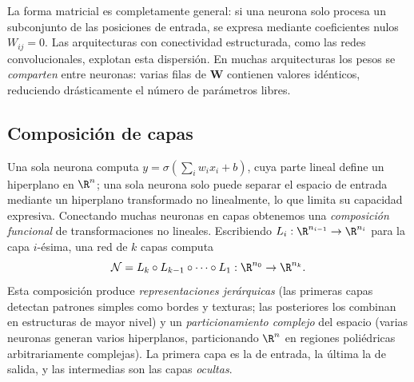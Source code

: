La forma matricial es completamente general: si una neurona solo procesa un
subconjunto de las posiciones de entrada, se expresa mediante coeficientes nulos
$W_{ij} = 0$. Las arquitecturas con conectividad estructurada, como las redes
convolucionales, explotan esta dispersi\'on. En muchas arquitecturas los pesos se
\emph{comparten} entre neuronas: varias filas de $\mathbf{W}$ contienen valores
id\'enticos, reduciendo dr\'asticamente el n\'umero de par\'ametros libres.

\subsection{Composici\'on de capas}
\label{sec:found:composition}

Una sola neurona computa $y = \sigma(\sum_i w_i x_i + b)$, cuya parte lineal define
un hiperplano en $\R^n$; una sola neurona solo puede separar el espacio de entrada
mediante un hiperplano transformado no linealmente, lo que limita su capacidad
expresiva. Conectando muchas neuronas en capas obtenemos una \emph{composici\'on
funcional} de transformaciones no lineales. Escribiendo $L_i : \R^{n_{i-1}} \to
\R^{n_i}$ para la capa $i$-\'esima, una red de $k$ capas computa
\[
  \mathcal{N} = L_k \circ L_{k-1} \circ \cdots \circ L_1 :
  \R^{n_0} \to \R^{n_k}.
\]
Esta composici\'on produce \emph{representaciones jer\'arquicas} (las primeras
capas detectan patrones simples como bordes y texturas; las posteriores los
combinan en estructuras de mayor nivel) y un \emph{particionamiento complejo} del
espacio (varias neuronas generan varios hiperplanos, particionando $\R^n$ en
regiones poli\'edricas arbitrariamente complejas). La primera capa es la de
entrada, la \'ultima la de salida, y las intermedias son las capas \emph{ocultas}.

